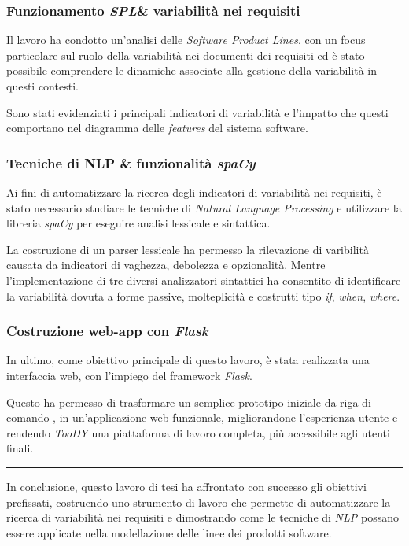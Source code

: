 \documentclass[12pt]{report}
\newcommand{\toody}{\textsl{TooDY}\xspace}
\newcommand{\flask}{\textsl{Flask}\xspace}
\newcommand{\spacy}{\textsl{spaCy}\xspace}
\newcommand{\spl}{\textsl{SPL}\xspace}
\newcommand{\nlp}{\textsl{NLP}\xspace}
\begin{document}
\subsubsection{Funzionamento \spl \& variabilità nei requisiti}
Il lavoro ha condotto un'analisi delle \textit{Software Product Lines}, con un focus particolare sul ruolo della variabilità nei documenti dei requisiti ed è stato possibile comprendere le dinamiche associate alla gestione della variabilità in questi contesti.

Sono stati evidenziati i principali indicatori di variabilità e l'impatto che questi comportano nel diagramma delle \textit{features} del sistema software.

\subsubsection{Tecniche di NLP \& funzionalità \spacy}
Ai fini di automatizzare la ricerca degli indicatori di variabilità nei requisiti, è stato necessario studiare le tecniche di \textit{Natural Language Processing} e utilizzare la libreria \spacy per eseguire analisi lessicale e sintattica.

La costruzione di un parser lessicale ha permesso la rilevazione di varibilità causata da indicatori di vaghezza, debolezza e opzionalità. Mentre l'implementazione di tre diversi analizzatori sintattici ha consentito di identificare la variabilità dovuta a forme passive, molteplicità e costrutti tipo \textit{if}, \textit{when}, \textit{where}.

\subsubsection{Costruzione web-app con \flask}
In ultimo, come obiettivo principale di questo lavoro, è stata realizzata una interfaccia web, con l'impiego del framework \flask.

Questo ha permesso di trasformare un semplice prototipo iniziale da riga di comando \cite{livi}, in un'applicazione web funzionale, migliorandone l'esperienza utente e rendendo \toody una piattaforma di lavoro completa, più accessibile agli utenti finali.

{\centering \rule{0.5\linewidth}{0.1pt} \par\vspace{0.25cm}}

In conclusione, questo lavoro di tesi ha affrontato con successo gli obiettivi prefissati, costruendo uno strumento di lavoro che permette di automatizzare la ricerca di variabilità nei requisiti e dimostrando come le tecniche di \nlp possano essere applicate nella modellazione delle linee dei prodotti software.
\end{document}
